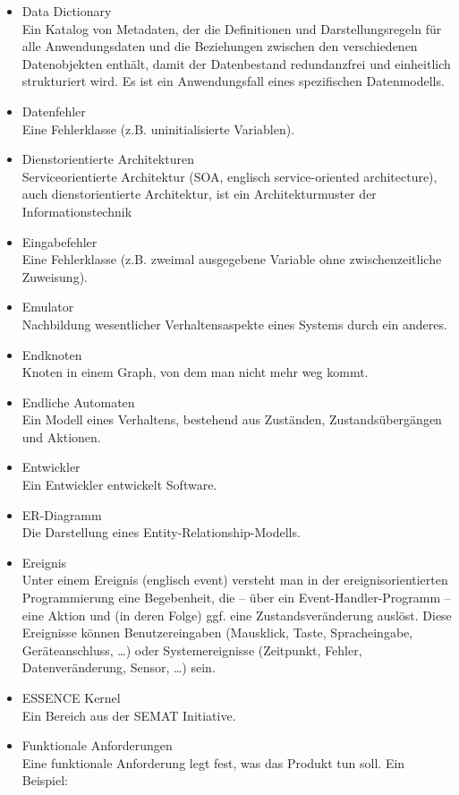 \begin{itemize}
\item 	Data Dictionary\\
Ein Katalog von Metadaten, der die Definitionen und Darstellungsregeln für alle Anwendungsdaten und die Beziehungen zwischen den verschiedenen Datenobjekten enthält, damit der Datenbestand redundanzfrei und einheitlich strukturiert wird. Es ist ein Anwendungsfall eines spezifischen Datenmodells.
\item Datenfehler \\ Eine Fehlerklasse (z.B. uninitialisierte Variablen).
\item 	Dienstorientierte Architekturen\\
Serviceorientierte Architektur (SOA, englisch service-oriented architecture), auch dienstorientierte Architektur, ist ein Architekturmuster der Informationstechnik
\item Eingabefehler  \\ Eine Fehlerklasse (z.B. zweimal ausgegebene Variable ohne zwischenzeitliche Zuweisung).
\item 	Emulator\\
Nachbildung wesentlicher Verhaltensaspekte eines Systems durch ein anderes.
\item 	Endknoten\\
Knoten in einem Graph, von dem man nicht mehr weg kommt.
\item 	Endliche Automaten\\
Ein Modell eines Verhaltens, bestehend aus Zuständen, Zustandsübergängen und Aktionen.
\item 	Entwickler\\
Ein Entwickler entwickelt Software.
\item 	ER-Diagramm\\
Die Darstellung eines Entity-Relationship-Modells.
\item 	Ereignis\\Unter einem Ereignis (englisch event) versteht man in der ereignisorientierten Programmierung eine Begebenheit, die – über ein Event-Handler-Programm – eine Aktion und (in deren Folge) ggf. eine Zustandsveränderung auslöst. Diese Ereignisse können Benutzereingaben (Mausklick, Taste, Spracheingabe, Geräteanschluss, …) oder Systemereignisse (Zeitpunkt, Fehler, Datenveränderung, Sensor, …) sein.
\item 	ESSENCE Kernel\\
Ein Bereich aus der SEMAT Initiative.
\item 	Funktionale Anforderungen\\
Eine funktionale Anforderung legt fest, was das Produkt tun soll. Ein Beispiel:

\end{itemize}
